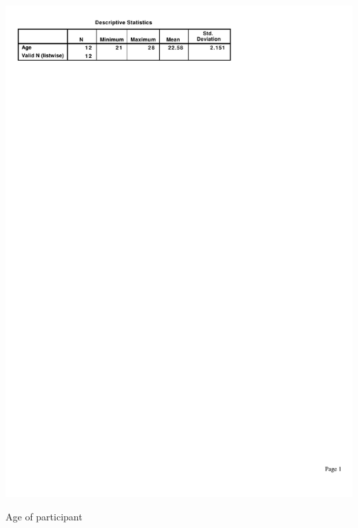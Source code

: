 \documentclass[11pt,openright,a4paper]{report}
\begin{document}
\begin{table}[ht]
\centerline{\includegraphics{figures/Age.pdf}}
\caption{Age of participant}
\label{fig:partic_age}
\end{table}
\end{document}
